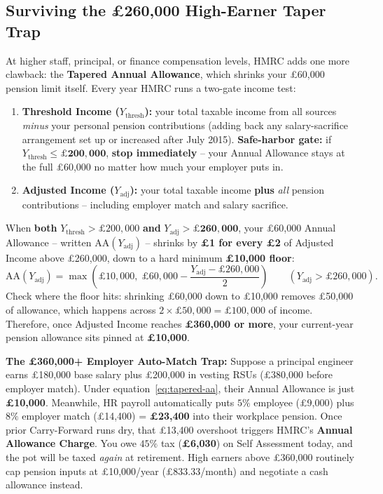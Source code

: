 \subsection{Surviving the \pounds 260,000 High-Earner Taper Trap}

At higher staff, principal, or finance compensation levels, HMRC adds one more clawback: the \textbf{Tapered Annual Allowance}, which shrinks your \pounds 60,000 pension limit itself. Every year HMRC runs a two-gate income test:
\begin{enumerate}
  \item \textbf{Threshold Income ($Y_{\text{thresh}}$):} your total taxable income from all sources \emph{minus} your personal pension contributions (adding back any salary-sacrifice arrangement set up or increased after July 2015). \textbf{Safe-harbor gate:} if $Y_{\text{thresh}} \le \mathbf{\pounds 200{,}000}$, \textbf{stop immediately} -- your Annual Allowance stays at the full \pounds 60,000 no matter how much your employer puts in.
  \item \textbf{Adjusted Income ($Y_{\text{adj}}$):} your total taxable income \textbf{plus} \emph{all} pension contributions -- including employer match and salary sacrifice.
\end{enumerate}

When \textbf{both} $Y_{\text{thresh}} > \pounds 200{,}000$ \textbf{and} $Y_{\text{adj}} > \mathbf{\pounds 260{,}000}$, your \pounds 60,000 Annual Allowance -- written $\text{AA}(Y_{\text{adj}})$ -- shrinks by \textbf{\pounds 1 for every \pounds 2} of Adjusted Income above \pounds 260,000, down to a hard minimum \textbf{\pounds 10,000 floor}:
\begin{equation}
  \text{AA}(Y_{\text{adj}}) = \max\!\left(\pounds 10{,}000,\; \pounds 60{,}000 - \frac{Y_{\text{adj}} - \pounds 260{,}000}{2}\right) \qquad (Y_{\text{adj}} > \pounds 260{,}000).
  \label{eq:tapered-aa}
\end{equation}
Check where the floor hits: shrinking \pounds 60,000 down to \pounds 10,000 removes \pounds 50,000 of allowance, which happens across $2 \times \pounds 50{,}000 = \pounds 100{,}000$ of income. Therefore, once Adjusted Income reaches \textbf{\pounds 360,000 or more}, your current-year pension allowance sits pinned at \textbf{\pounds 10,000}.

\begin{trapbox}
\textbf{The \pounds 360,000+ Employer Auto-Match Trap:} Suppose a principal engineer earns \pounds 180,000 base salary plus \pounds 200,000 in vesting RSUs (\pounds 380,000 before employer match). Under equation~\eqref{eq:tapered-aa}, their Annual Allowance is just \textbf{\pounds 10,000}. Meanwhile, HR payroll automatically puts $5\%$ employee (\pounds 9,000) plus $8\%$ employer match (\pounds 14,400) = \textbf{\pounds 23,400} into their workplace pension. Once prior Carry-Forward runs dry, that \pounds 13,400 overshoot triggers HMRC's \textbf{Annual Allowance Charge}. You owe $45\%$ tax (\textbf{\pounds 6,030}) on Self Assessment today, and the pot will be taxed \emph{again} at retirement. High earners above \pounds 360,000 routinely cap pension inputs at \pounds 10,000/year (\pounds 833.33/month) and negotiate a cash allowance instead.
\end{trapbox}

